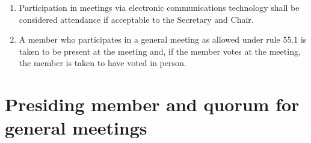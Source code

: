 \begin{enumerate}

\item Participation in meetings via electronic communications technology shall be considered attendance if acceptable to the Secretary and Chair.
\item A member who participates in a general meeting as allowed under rule 55.1 is taken to be present at the meeting and, if the member votes at the meeting, the member is taken to have voted in person.
\end{enumerate}

\hypertarget{presiding-member-and-quorum-for-general-meetings}{%
\section{Presiding member and quorum for general meetings}\label{presiding-member-and-quorum-for-general-meetings}}

